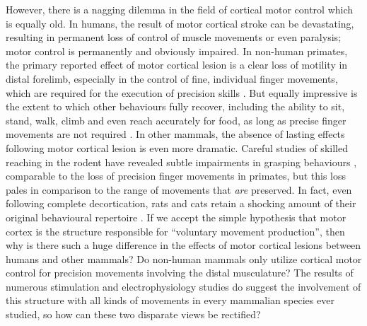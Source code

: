 However, there is a nagging dilemma in the field of cortical motor control which is equally old. In humans, the result of motor cortical stroke can be devastating, resulting in permanent loss of control of muscle movements or even paralysis; motor control is permanently and obviously impaired. In non-human primates, the primary reported effect of motor cortical lesion is a clear loss of motility in distal forelimb, especially in the control of fine, individual finger movements, which are required for the execution of precision skills \cite{Leyton1917,Darling2011}. But equally impressive is the extent to which other behaviours fully recover, including the ability to sit, stand, walk, climb and even reach accurately for food, as long as precise finger movements are not required \cite{Leyton1917,Darling2011}. In other mammals, the absence of lasting effects following motor cortical lesion is even more dramatic. Careful studies of skilled reaching in the rodent have revealed subtle impairments in grasping behaviours \cite{Alaverdashvili2008a}, comparable to the loss of precision finger movements in primates, but this loss pales in comparison to the range of movements that \emph{are} preserved. In fact, even following complete decortication, rats and cats retain a shocking amount of their original behavioural repertoire \cite{Bjursten1976,Terry1989}. If we accept the simple hypothesis that motor cortex is the structure responsible for ``voluntary movement production'', then why is there such a huge difference in the effects of motor cortical lesions between humans and other mammals? Do non-human mammals only utilize cortical motor control for precision movements involving the distal musculature? The results of numerous stimulation and electrophysiology studies do suggest the involvement of this structure with all kinds of movements in every mammalian species ever studied, so how can these two disparate views be rectified?

